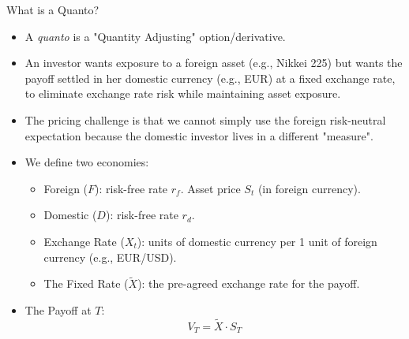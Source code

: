 \documentclass{beamer}
\begin{document}
\begin{frame}{What is a Quanto?}
	\begin{itemize}
		\item A \emph{quanto} is a "Quantity Adjusting" option/derivative.
		\item An investor wants exposure to a foreign asset (e.g., Nikkei 225) but wants the payoff settled in her domestic currency (e.g., EUR) at a fixed exchange rate,
		to eliminate exchange rate risk while maintaining asset exposure.
		\item The pricing challenge is that we cannot simply use the foreign risk-neutral expectation because the domestic investor lives in a different "measure".
		\item We define two economies:
		\begin{itemize}
			\item Foreign ($F$): risk-free rate $r_f$. Asset price $S_t$ (in foreign currency).
			\item Domestic ($D$): risk-free rate $r_d$.
			\item Exchange Rate ($X_t$): units of domestic currency per 1 unit of foreign currency (e.g., EUR/USD).
			\item The Fixed Rate ($\tilde{X}$): the pre-agreed exchange rate for the payoff.
		\end{itemize}
		\item The Payoff at $T$:
		\begin{equation}
			V_T=\tilde{X}\cdot S_T
		\end{equation}
	\end{itemize}
\end{frame}
\end{document}
